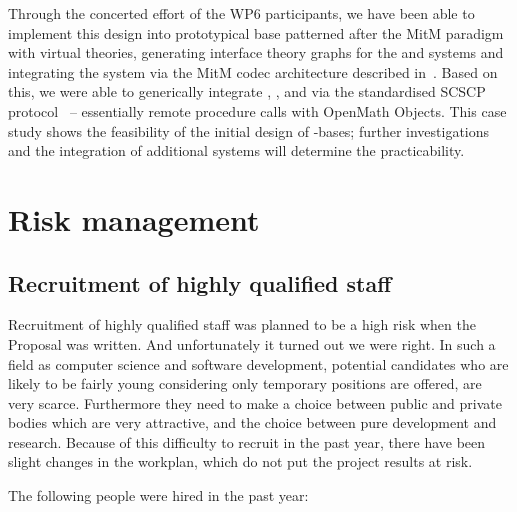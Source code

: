 \documentclass{deliverablereport}
\begin{document}
Through the concerted effort of the WP6 participants, we have been
able to implement this design into prototypical \DKS base patterned
after the MitM paradigm with virtual theories, generating interface
theory graphs for the \GAP and \Sage systems and integrating the
\LMFDB system via the MitM codec architecture described
in~\cite{ODK-D6.2}. Based on this, we were able to generically
integrate \GAP, \Sage, and \LMFDB via the standardised SCSCP
protocol~\cite{HorRoz:ossp09} -- essentially remote procedure calls
with OpenMath Objects. This case study shows the feasibility of the
initial design of \DKS-bases; further investigations and the
integration of additional systems will determine the practicability.

\section{Risk management}
\subsection{Recruitment of highly qualified staff}
Recruitment of highly qualified staff was planned to be a high risk
when the Proposal was written. And unfortunately it turned out we were
right. In such a field as computer science and software development,
potential candidates who are likely to be fairly young considering
only temporary positions are offered, are very scarce. Furthermore
they need to make a choice between public and private bodies which are
very attractive, and the choice between pure development and research.
Because of this difficulty to recruit in the past year, there have
been slight changes in the workplan, which do
not put the project results at risk.

The following people were hired in the past year:\\
\end{document}
